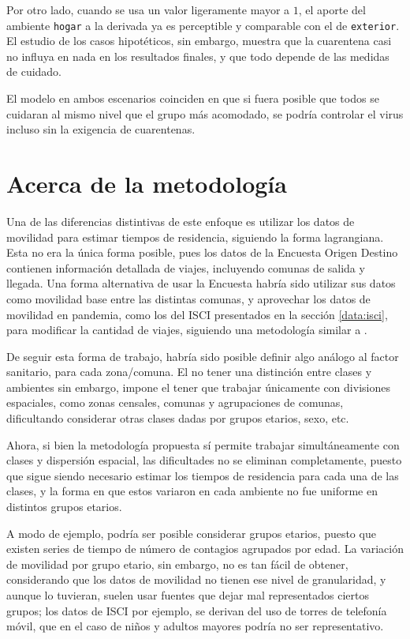 Por otro lado, cuando se usa un valor ligeramente mayor a \(1\), el aporte del ambiente \texttt{hogar} a la derivada ya es perceptible y comparable con el de \texttt{exterior}. El estudio de los casos hipotéticos, sin embargo, muestra que la cuarentena casi no influya en nada en los resultados finales, y que todo depende de las medidas de cuidado. 

El modelo en ambos escenarios coinciden en que si fuera posible que todos se cuidaran al mismo nivel que el grupo más acomodado, se podría controlar el virus incluso sin la exigencia de cuarentenas.

\section{Acerca de la metodología}\label{dis:metod}



Una de las diferencias distintivas de este enfoque es utilizar los datos de movilidad para estimar tiempos de residencia, siguiendo la forma lagrangiana. Esta no era la única forma posible, pues los datos de la Encuesta Origen Destino contienen información detallada de viajes, incluyendo comunas de salida y llegada. Una forma alternativa de usar la Encuesta habría sido utilizar sus datos como movilidad base entre las distintas comunas, y aprovechar los datos de movilidad en pandemia, como los del ISCI presentados en la sección \ref{data:isci}, para modificar la cantidad de viajes, siguiendo una metodología similar a \cite{Lai2020}.

De seguir esta forma de trabajo, habría sido posible definir algo análogo al factor sanitario, para cada zona/comuna. El no tener una distinción entre clases y ambientes sin embargo, impone el tener que trabajar únicamente con divisiones espaciales, como zonas censales, comunas y agrupaciones de comunas, dificultando considerar otras clases dadas por grupos etarios, sexo, etc.

Ahora, si bien la metodología propuesta sí permite trabajar simultáneamente con clases y dispersión espacial, las dificultades no se eliminan completamente, puesto que sigue siendo necesario estimar los tiempos de residencia para cada una de las clases, y la forma en que estos variaron en cada ambiente no fue uniforme en distintos grupos etarios.

A modo de ejemplo, podría ser posible considerar grupos etarios, puesto que existen series de tiempo de número de contagios agrupados por edad. La variación de movilidad por grupo etario, sin embargo, no es tan fácil de obtener, considerando que los datos de movilidad no tienen ese nivel de granularidad, y aunque lo tuvieran, suelen usar fuentes que dejar mal representados ciertos grupos; los datos de ISCI por ejemplo, se derivan del uso de torres de telefonía móvil, que en el caso de niños y adultos mayores podría no ser representativo.

